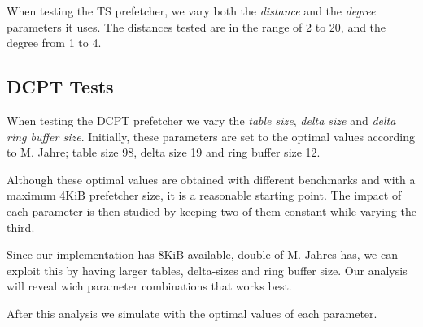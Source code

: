 When testing the TS prefetcher, we vary both the \emph{distance} and the
\emph{degree} parameters it uses. The distances tested are in the range of 2 to
20, and the degree from 1 to 4. 

\subsection{DCPT Tests}

When testing the DCPT prefetcher we vary the \emph{table size}, \emph{delta
size} and \emph{delta ring buffer size}. Initially, these parameters are set to
the optimal values according to M. Jahre\cite{dcpt}; table size 98, delta size
19 and ring buffer size 12.

Although these optimal values are obtained with different benchmarks and with a
maximum 4KiB prefetcher size, it is a reasonable starting point. The impact of
each parameter is then studied by keeping two of them constant while varying the
third.

Since our implementation has 8KiB available, double of M. Jahres \cite{dcpt} has, we can exploit this by having larger tables, delta-sizes and ring buffer size.
Our analysis will reveal wich parameter combinations that works best.

After this analysis we simulate with the optimal values of each parameter.


